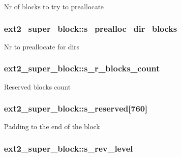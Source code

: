 \-Nr of blocks to try to preallocate \hypertarget{structext2__super__block_aa820a721fcbf64ee9aa797bca3171785}{
\subsubsection[{s\-\_\-prealloc\-\_\-dir\-\_\-blocks}]{ {\bf ext2\-\_\-super\-\_\-block\-::s\-\_\-prealloc\-\_\-dir\-\_\-blocks}}}\label{structext2__super__block_aa820a721fcbf64ee9aa797bca3171785}
\-Nr to preallocate for dirs \hypertarget{structext2__super__block_a660db33fc94622167793c6b080c515e4}{
\subsubsection[{s\-\_\-r\-\_\-blocks\-\_\-count}]{ {\bf ext2\-\_\-super\-\_\-block\-::s\-\_\-r\-\_\-blocks\-\_\-count}}}\label{structext2__super__block_a660db33fc94622167793c6b080c515e4}
\-Reserved blocks count \hypertarget{structext2__super__block_a17e0d263a7fceb8b53aff24b66c216df}{
\subsubsection[{s\-\_\-reserved}]{ {\bf ext2\-\_\-super\-\_\-block\-::s\-\_\-reserved}\mbox{[}760\mbox{]}}}\label{structext2__super__block_a17e0d263a7fceb8b53aff24b66c216df}
\-Padding to the end of the block \hypertarget{structext2__super__block_a70b07eaf44b6a5e777b8072ee4b593b4}{
\subsubsection[{s\-\_\-rev\-\_\-level}]{ {\bf ext2\-\_\-super\-\_\-block\-::s\-\_\-rev\-\_\-level}}}\label{structext2__super__block_a70b07eaf44b6a5e777b8072ee4b593b4}
